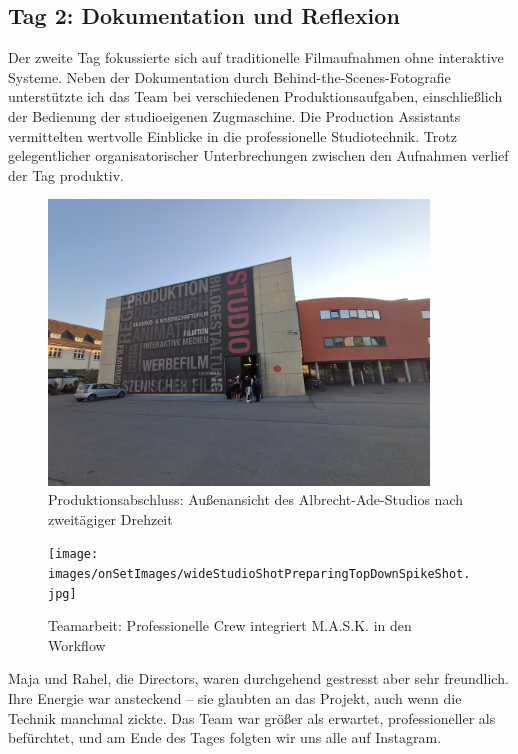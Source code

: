 \subsection{Tag 2: Dokumentation und Reflexion}

Der zweite Tag fokussierte sich auf traditionelle Filmaufnahmen ohne interaktive Systeme. Neben der Dokumentation durch Behind-the-Scenes-Fotografie unterstützte ich das Team bei verschiedenen Produktionsaufgaben, einschließlich der Bedienung der studioeigenen Zugmaschine. Die Production Assistants vermittelten wertvolle Einblicke in die professionelle Studiotechnik. Trotz gelegentlicher organisatorischer Unterbrechungen zwischen den Aufnahmen verlief der Tag produktiv.

\begin{figure}[h]
   \centering
   \includegraphics[width=0.9\textwidth]{images/onSetImages/WideShotOfOutsideOfStudioAfter2DayShoot.jpg}
   \caption{Produktionsabschluss: Außenansicht des Albrecht-Ade-Studios nach zweitägiger Drehzeit}
   \label{fig:studio_exterior}
\end{figure}

\begin{figure}[h]
   \centering
   \texttt{[image: images/onSetImages/wideStudioShotPreparingTopDownSpikeShot.jpg]}
   \caption{Teamarbeit: Professionelle Crew integriert M.A.S.K. in den Workflow}
   \label{fig:crew_setup}
\end{figure}

Maja und Rahel, die Directors, waren durchgehend gestresst aber sehr freundlich. Ihre Energie war ansteckend – sie glaubten an das Projekt, auch wenn die Technik manchmal zickte. Das Team war größer als erwartet, professioneller als befürchtet, und am Ende des Tages folgten wir uns alle auf Instagram.

